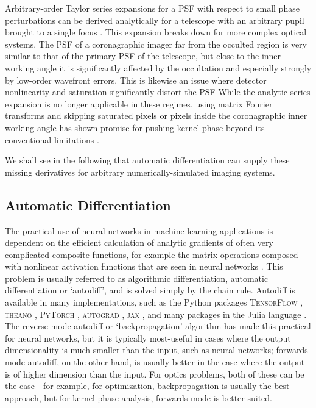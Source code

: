 \documentclass[modern]{aastex63}
\begin{document}
Arbitrary-order Taylor series expansions for a PSF with respect to small phase perturbations can be derived analytically for a telescope with an arbitrary pupil brought to a single focus \citep{bloemhof01,anand02,perrin03}. This expansion breaks down for more complex optical systems. The PSF of a coronagraphic imager far from the occulted region is very similar to that of the primary PSF of the telescope, but close to the inner working angle it is significantly affected by the occultation and especially strongly by low-order wavefront errors. This is likewise an issue where detector nonlinearity and saturation significantly distort the PSF While the analytic series expansion is no longer applicable in these regimes, using matrix Fourier transforms and skipping saturated pixels or pixels inside the coronagraphic inner working angle has shown promise for pushing kernel phase beyond its conventional limitations \citep{laugier19b}. 

We shall see in the following that automatic differentiation can supply these missing derivatives for arbitrary numerically-simulated imaging systems.

\subsection{Automatic Differentiation}
The practical use of neural networks in machine learning applications is dependent on the efficient calculation of analytic gradients of often very complicated composite functions, for example the matrix operations composed with nonlinear activation functions that are seen in neural networks \citep{lecun15}. This problem is usually referred to as algorithmic differentiation, automatic differentiation or `autodiff', and is solved simply by the chain rule.
Autodiff is available in many implementations, such as the Python packages \textsc{TensorFlow} \citep{tensorflow2015}, \textsc{theano} \citep{theano}, \textsc{PyTorch} \citep{pytorch}, \textsc{autograd} \citep{autograd}, \textsc{jax} \citep{jax}, and many packages in the Julia language \citep{julia}. The reverse-mode autodiff or `backpropagation' algorithm \citep{linnainmaa1970,lecun1988theoretical} has made this practical for neural networks, but it is typically most-useful in cases where the output dimensionality is much smaller than the input, such as neural networks; forwards-mode autodiff, on the other hand, is usually better in the case where the output is of higher dimension than the input. For optics problems, both of these can be the case - for example, for optimization, backpropagation is usually the best approach, but for kernel phase analysis, forwards mode is better suited.
\end{document}
